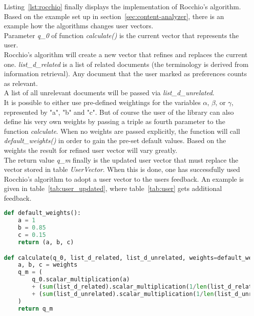 \noindent
Listing~\ref{lst:rocchio} finally displays the implementation of Rocchio's algorithm.
Based on the example set up in section~\ref{sec:content-analyzer}, there is an example how the algorithms changes user vectors.\\
Parameter \textit{q\_0} of function \textit{calculate()} is the current vector that represents the user.\\
Rocchio's algorithm will create a new vector that refines and replaces the current one.
\textit{list\_d\_related} is a list of related documents (the terminology is derived from information retrieval).
Any document that the user marked as preferences counts as relevant.\\
A list of all unrelevant documents will be passed via \textit{list\_d\_unrelated}.\\
It is possible to either use pre-defined weightings for the variables $\alpha$, $\beta$, or $\gamma$, represented by "a", "b" and "c".
But of course the user of the library can also define his very own weights by passing a triple as fourth parameter to the function \textit{calculate}.
When no weights are passed explicitly, the function will call \textit{default\_weights()} in order to gain the pre-set default values.
Based on the weights the result for refined user vector will vary greatly.\\
The return value \textit{q\_m} finally is the updated user vector that must replace the vector stored in table \textit{UserVector}.
When this is done, one has successfully used Rocchio's algorithm to adopt a user vector to the users feedback.
An example is given in table~\ref{tab:user_updated}, where table~\ref{tab:user} gets additional feedback.

\begin{lstlisting}[language=Python,caption={Implementation of Rocchio's algorithm},label={lst:rocchio},float=h]
def default_weights():
    a = 1
    b = 0.85
    c = 0.15
    return (a, b, c)

def calculate(q_0, list_d_related, list_d_unrelated, weights=default_weights()):
    a, b, c = weights
    q_m = (
        q_0.scalar_multiplication(a)
        + (sum(list_d_related).scalar_multiplication(1/len(list_d_related))).scalar_multiplication(b)
        + (sum(list_d_unrelated).scalar_multiplication(1/len(list_d_unrelated))).scalar_multiplication(c)
    )
    return q_m
\end{lstlisting}


